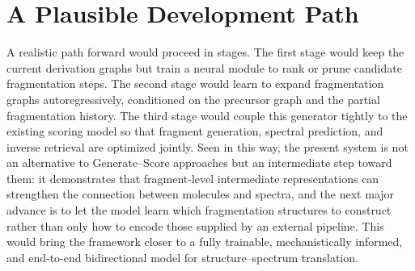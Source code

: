 \section{A Plausible Development Path}
A realistic path forward would proceed in stages.
The first stage would keep the current derivation graphs but train a neural module to rank or prune candidate fragmentation steps.
The second stage would learn to expand fragmentation graphs autoregressively, conditioned on the precursor graph and the partial fragmentation history.
The third stage would couple this generator tightly to the existing scoring model so that fragment generation, spectral prediction, and inverse retrieval are optimized jointly.
Seen in this way, the present system is not an alternative to Generate--Score approaches but an intermediate step toward them: it demonstrates that fragment-level intermediate representations can strengthen the connection between molecules and spectra, and the next major advance is to let the model learn which fragmentation structures to construct rather than only how to encode those supplied by an external pipeline.
This would bring the framework closer to a fully trainable, mechanistically informed, and end-to-end bidirectional model for structure--spectrum translation.
